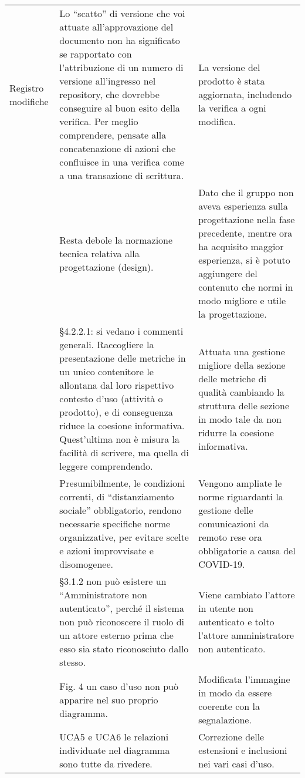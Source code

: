 {\begin{longtable}{ C{2.2cm} C{6cm} C{6cm}}
		Registro modifiche & Lo “scatto” di versione che voi attuate all’approvazione del documento non ha significato se rapportato con l’attribuzione di un numero di versione all’ingresso nel repository, che dovrebbe conseguire al buon esito della verifica. Per meglio comprendere, pensate alla concatenazione di azioni che confluisce in una verifica come a una transazione di scrittura. & La versione del prodotto è stata aggiornata, includendo la verifica a ogni modifica.\\
		
		\NdP & Resta debole la normazione tecnica relativa alla
		progettazione (design). & Dato che il gruppo non aveva esperienza sulla progettazione nella fase precedente, mentre ora ha acquisito maggior esperienza, si è potuto aggiungere del contenuto che normi in modo migliore e utile la progettazione.\\
		
		\NdP & §4.2.2.1: si vedano i commenti generali. Raccogliere
		la presentazione delle metriche in un unico contenitore le allontana dal loro
		rispettivo contesto d’uso (attività o prodotto), e di conseguenza riduce la
		coesione informativa. Quest’ultima non è misura la facilità di scrivere, ma
		quella di leggere comprendendo. & Attuata una gestione migliore della sezione delle metriche di qualità cambiando la struttura delle sezione in modo tale da non ridurre la coesione informativa.\\
		
		\NdP & Presumibilmente, le condizioni correnti, di “distanziamento sociale” obbligatorio, rendono necessarie specifiche norme organizzative, per evitare scelte e azioni improvvisate e disomogenee. & Vengono ampliate le norme riguardanti la gestione delle comunicazioni da remoto rese ora obbligatorie a causa del COVID-19.\\
		
		\AdR & §3.1.2 non può esistere un “Amministratore non autenticato”, perché il
		sistema non può riconoscere il ruolo di un attore esterno prima che esso sia
		stato riconosciuto dallo stesso. & Viene cambiato l'attore in utente non autenticato e tolto l'attore amministratore non autenticato.\\
		
		\AdR & Fig. 4 un caso d’uso non può apparire nel suo proprio diagramma. & Modificata l'immagine in modo da essere coerente con la segnalazione.\\
		
		\AdR & UCA5 e UCA6 le relazioni individuate nel diagramma sono tutte da rivedere. & Correzione delle estensioni e inclusioni nei vari casi d'uso.\\
		

\end{longtable}}
